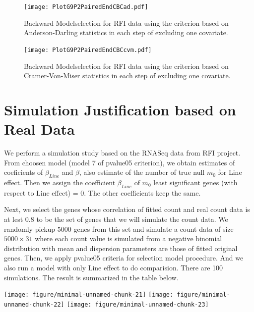 \documentclass[12pt, letter]{article}\usepackage[]{graphicx}\usepackage[]{color}
\newenvironment{knitrout}{}{} %
\begin{document}
\begin{figure}[h!]
\centering
\texttt{[image: PlotG9P2PairedEndCBCad.pdf]}
\caption{Backward Modelselection for RFI data using the criterion based on Anderson-Darling statistics in each step of excluding one covariate. }
\end{figure}


\begin{figure}[h!]
\centering
\texttt{[image: PlotG9P2PairedEndCBCcvm.pdf]}
\caption{Backward Modelselection for RFI data using the criterion based on Cramer-Von-Miser statistics in each step of excluding one covariate. }
\end{figure}


\section{\bf Simulation Justification based on Real Data}
We perform a simulation study based on the RNASeq data from RFI project. From choosen 
model (model 7 of pvalue05 criterion), we obtain estimates of coeficients of $\beta_{Line}$ and $\beta$, also estimate of the number of true null $m_{0}$ for Line effect. Then we assign the coefficient $\beta_{Line}$ of  $m_0$  least significant genes (with respect to Line effect) = 0. The other coefficients keep the same. 

Next, we select the genes whose correlation of fitted count and real count data is at lest 0.8 to be the set of genes that we will simulate the count data. We randomly pickup 5000 genes from this set and simulate a count data of size $5000\times 31$ where each count value is simulated from a negative binomial distribution with mean and dispersion parameters are those of fitted original genes. Then, we apply pvalue05 criteria for selection model procedure. And we also run a model with only Line effect to do comparision. There are 100 simulations. The result is summarized in the table below.



\begin{knitrout}
\color{fgcolor}

{\centering \texttt{[image: figure/minimal-unnamed-chunk-21]} 
\texttt{[image: figure/minimal-unnamed-chunk-22]} 
\texttt{[image: figure/minimal-unnamed-chunk-23]} 

}



\end{knitrout}
\end{document}

